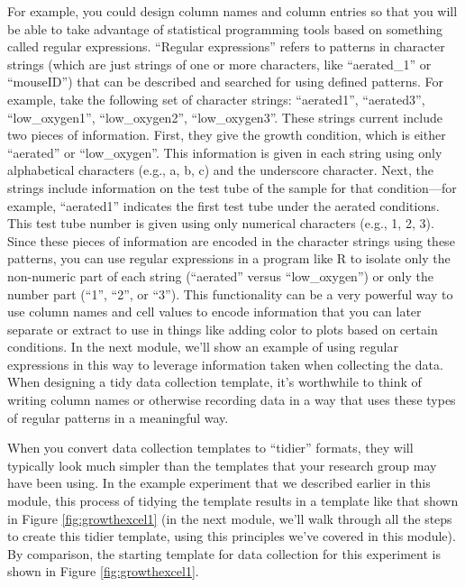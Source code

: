 \documentclass[]{tufte-book}
\begin{document}
For example, you could design column names and column entries so that you will
be able to take advantage of statistical programming tools based on something
called regular expressions. ``Regular expressions'' refers to patterns in
character strings (which are just strings of one or more characters, like
``aerated\_1'' or ``mouseID'') that can be described and searched for using defined
patterns. For example, take the following set of character strings: ``aerated1'',
``aerated3'', ``low\_oxygen1'', ``low\_oxygen2'', ``low\_oxygen3''. These strings current
include two pieces of information. First, they give the growth condition, which
is either ``aerated'' or ``low\_oxygen''. This information is given in each string
using only alphabetical characters (e.g., a, b, c) and the underscore character.
Next, the strings include information on the test tube of the sample for that
condition---for example, ``aerated1'' indicates the first test tube under the
aerated conditions. This test tube number is given using only numerical
characters (e.g., 1, 2, 3). Since these pieces of information are encoded
in the character strings using these patterns, you can use regular expressions
in a program like R to isolate only the non-numeric part of each string
(``aerated'' versus ``low\_oxygen'') or only the number part (``1'', ``2'', or ``3'').
This functionality can be a very powerful way to use column names and cell values
to encode information that you can later separate or extract to use in things
like adding color to plots based on certain conditions. In the next module,
we'll show an example of using regular expressions in this way to leverage
information taken when collecting the data. When designing a tidy data collection
template, it's worthwhile to think of writing column names or otherwise recording
data in a way that uses these types of regular patterns in a meaningful way.

When you convert data collection templates to ``tidier'' formats, they will
typically look much simpler than the templates that your research group may have
been using. In the example experiment that we described earlier in this module,
this process of tidying the template results in a template like that shown in
Figure \ref{fig:growthexcel1} (in the next module, we'll walk through all the
steps to create this tidier template, using this principles we've covered in
this module). By comparison, the starting template for data collection for this
experiment is shown in Figure \ref{fig:growthexcel1}.
\end{document}
